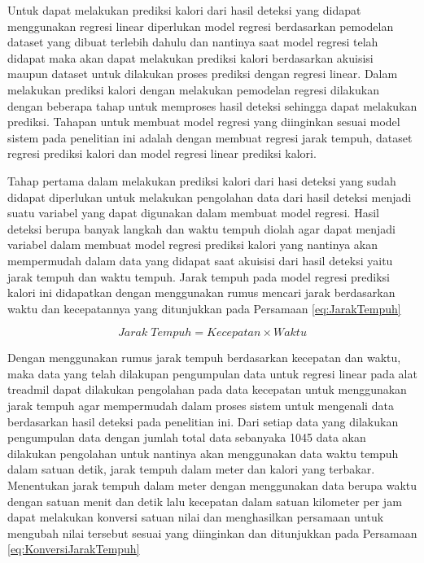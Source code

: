 Untuk dapat melakukan prediksi kalori dari hasil deteksi yang didapat menggunakan regresi linear diperlukan model regresi berdasarkan pemodelan dataset yang dibuat terlebih dahulu dan nantinya saat model regresi telah didapat maka akan dapat melakukan prediksi kalori berdasarkan akuisisi maupun dataset untuk dilakukan proses prediksi dengan regresi linear. Dalam melakukan prediksi kalori dengan melakukan pemodelan regresi dilakukan dengan beberapa tahap untuk memproses hasil deteksi sehingga dapat melakukan prediksi. Tahapan untuk membuat model regresi yang diinginkan sesuai model sistem pada penelitian ini adalah dengan membuat regresi jarak tempuh, dataset regresi prediksi kalori dan model regresi linear prediksi kalori.

Tahap pertama dalam melakukan prediksi kalori dari hasi deteksi yang sudah didapat diperlukan untuk melakukan pengolahan data dari hasil deteksi menjadi suatu variabel yang dapat digunakan dalam membuat model regresi. Hasil deteksi berupa banyak langkah dan waktu tempuh diolah agar dapat menjadi variabel dalam membuat model regresi prediksi kalori yang nantinya akan mempermudah dalam data yang didapat saat akuisisi dari hasil deteksi yaitu jarak tempuh dan waktu tempuh. Jarak tempuh pada model regresi prediksi kalori ini didapatkan dengan menggunakan rumus mencari jarak berdasarkan waktu dan kecepatannya yang ditunjukkan pada Persamaan \ref{eq:JarakTempuh}

\begin{equation}
  \label{eq:JarakTempuh}
  Jarak \; Tempuh = Kecepatan \times Waktu
\end{equation}

Dengan menggunakan rumus jarak tempuh berdasarkan kecepatan dan waktu, maka data yang telah dilakupan pengumpulan data untuk regresi linear pada alat treadmil dapat dilakukan pengolahan pada data kecepatan untuk menggunakan jarak tempuh agar mempermudah dalam proses sistem untuk mengenali data berdasarkan hasil deteksi pada penelitian ini. Dari setiap data yang dilakukan pengumpulan data dengan jumlah total data sebanyaka 1045 data akan dilakukan pengolahan untuk nantinya akan menggunakan data waktu tempuh dalam satuan detik, jarak tempuh dalam meter dan kalori yang terbakar. Menentukan jarak tempuh dalam meter dengan menggunakan data berupa waktu dengan satuan menit dan detik lalu kecepatan dalam satuan kilometer per jam dapat melakukan konversi satuan nilai dan menghasilkan persamaan untuk mengubah nilai tersebut sesuai yang diinginkan dan ditunjukkan pada Persamaan \ref{eq:KonversiJarakTempuh}

